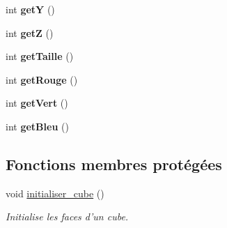 \begin{DoxyCompactItemize}
\item 
\hypertarget{classCube_ab4e951c24701feed0b63ce63cb7e8c97}{int {\bfseries get\-Y} ()}\label{classCube_ab4e951c24701feed0b63ce63cb7e8c97}

\item 
\hypertarget{classCube_a803a27c6e5dc68770127f44295f9416c}{int {\bfseries get\-Z} ()}\label{classCube_a803a27c6e5dc68770127f44295f9416c}

\item 
\hypertarget{classCube_a70621eb12f52a957af2788fbdb6ec76e}{int {\bfseries get\-Taille} ()}\label{classCube_a70621eb12f52a957af2788fbdb6ec76e}

\item 
\hypertarget{classCube_a4f9079c9c5d882924d9c626dc655a60f}{int {\bfseries get\-Rouge} ()}\label{classCube_a4f9079c9c5d882924d9c626dc655a60f}

\item 
\hypertarget{classCube_a32a5e44317458720135c32feb2801d43}{int {\bfseries get\-Vert} ()}\label{classCube_a32a5e44317458720135c32feb2801d43}

\item 
\hypertarget{classCube_a37388ae818ea4a24abce5910d1d7fd5d}{int {\bfseries get\-Bleu} ()}\label{classCube_a37388ae818ea4a24abce5910d1d7fd5d}

\end{DoxyCompactItemize}
\subsection*{Fonctions membres protégées}
\begin{DoxyCompactItemize}
\item 
\hypertarget{classCube_a5e4ade27eddade88c60cafe3889be95b}{void \hyperlink{classCube_a5e4ade27eddade88c60cafe3889be95b}{initialiser\-\_\-cube} ()}\label{classCube_a5e4ade27eddade88c60cafe3889be95b}

\begin{DoxyCompactList}\small\item\em Initialise les faces d'un cube. \end{DoxyCompactList}\end{DoxyCompactItemize}

